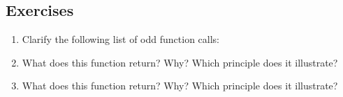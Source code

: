 \subsection{Exercises}

\begin{enumerate}
\def\labelenumi{\arabic{enumi}.}
\item
  Clarify the following list of odd function calls:

\begin{Shaded}
\begin{Highlighting}[]
\StringTok{ }\NormalTok{(} \NormalTok{, }\NormalTok{, } \NormalTok{(}\NormalTok{:}\NormalTok{, }\NormalTok{))}
\StringTok{ }\NormalTok{(} \NormalTok{, } \NormalTok{, }\NormalTok{)}
\NormalTok{(} \NormalTok{, }  \NormalTok{, } 
\end{Highlighting}
\end{Shaded}
\item
  What does this function return? Why? Which principle does it
  illustrate?

\begin{Shaded}
\begin{Highlighting}[]
\StringTok{ } \StringTok{ }\NormalTok{; }\NormalTok{\}, } \NormalTok{) \{}
  \StringTok{ }
\NormalTok{\}}
\NormalTok{()}
\end{Highlighting}
\end{Shaded}
\item
  What does this function return? Why? Which principle does it
  illustrate?

\begin{Shaded}
\begin{Highlighting}[]
\StringTok{ } 
  \StringTok{ }
\NormalTok{\}}
\NormalTok{()}
\end{Highlighting}
\end{Shaded}
\end{enumerate}

